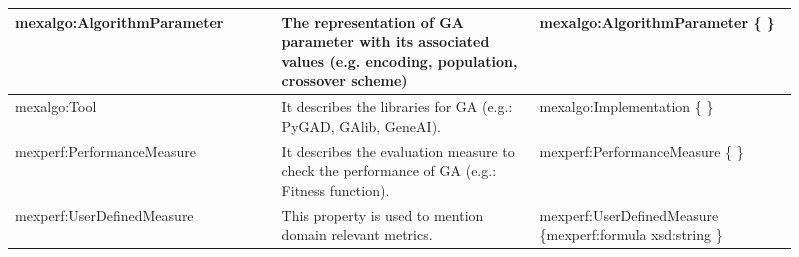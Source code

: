 \documentclass[preprint,12pt]{elsarticle}
\begin{document}
{\begin{longtable}[!h]{ | p{0.31\linewidth} | p{0.3\linewidth}| p{0.3\linewidth} |}
mexalgo:AlgorithmParameter & The representation of GA parameter with its associated values (e.g. encoding, population, crossover scheme) & {\scriptsize  mexalgo:AlgorithmParameter  \{     \}      }\\
\hline  


mexalgo:Tool & It describes the libraries for GA (e.g.: PyGAD, GAlib, GeneAI). & {\scriptsize  mexalgo:Implementation  \{     \}      }\\
\hline

mexperf:PerformanceMeasure & It describes the evaluation measure to check the performance of GA (e.g.: Fitness function). &  {\scriptsize  mexperf:PerformanceMeasure  \{ \newline      \}      }\\
\hline

mexperf:UserDefinedMeasure  & This property is used to mention domain relevant metrics.       &   {\scriptsize   mexperf:UserDefinedMeasure \{\newline mexperf:formula xsd:string \newline    \}      }\\
\hline


\end{longtable}
}
\end{document}
